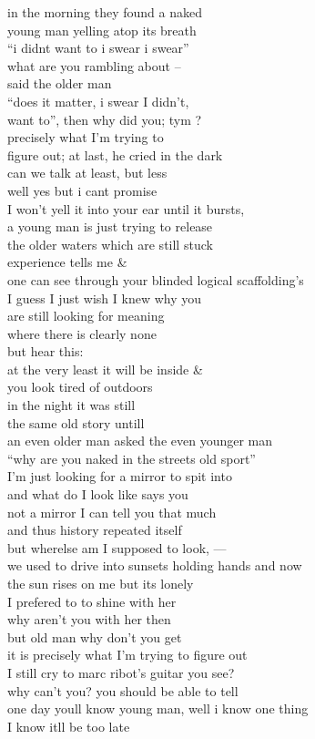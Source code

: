 in the morning they found a naked \\
young man yelling atop its breath\\
``i didnt want to i swear i swear'' \\
what are you rambling about --\\
said the older man\\
``does it matter, i swear I didn't,\\
want to'', then why did you; tym ?\\
precisely what I'm trying to \\
figure out; at last, he cried in the dark\\

can we talk at least, but less\\
well yes but i cant promise\\
I won't yell it into your ear until it bursts,\\
a young man is just trying to release\\
the older waters which are still stuck\\
experience tells me \&\\
one can see through your blinded logical scaffolding's\\
I guess I just wish I knew why you\\
are still looking for meaning\\
where there is clearly none\\
but hear this: \\
at the very least it will be inside \& \\



you look tired of outdoors\\
in the night it was still \\
the same old story untill\\
an even older man asked the even younger man \\
``why are you naked in the streets old sport''\\
I'm just looking for a mirror to spit into\\
and what do I look like says you \\
not a mirror I can tell you that much\\
and thus history repeated itself\\

but wherelse am I supposed to look, ---\\
we used to drive into sunsets holding hands and now\\
the sun rises on me but its lonely\\
I prefered to to shine with her\\
why aren't you with her then\\
but old man why don't you get\\
it is precisely what I'm trying to figure out\\
I still cry to marc ribot's guitar you see?\\
why can't you? you should be able to tell\\
one day youll know young man,
well i know one thing\\
I know itll be too late\\

